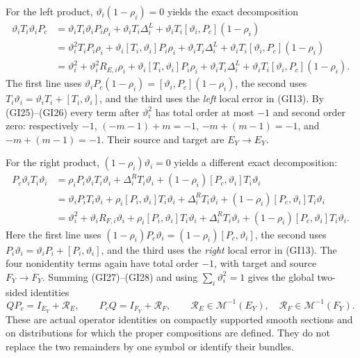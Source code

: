 \documentclass[
  11pt,
]{article}
\begin{document}
For the left product, \(\vartheta_i(1-\rho_i)=0\) yields the exact
decomposition \[
\begin{aligned}
 \vartheta_iT_i\vartheta_iP_c
 &=\vartheta_iT_i\vartheta_iP_i\rho_i
   +\vartheta_iT_i\Delta_i^L
   +\vartheta_iT_i[\vartheta_i,P_c](1-\rho_i)\\
 &=\vartheta_i^2T_iP_i\rho_i
   +\vartheta_i[T_i,\vartheta_i]P_i\rho_i
   +\vartheta_iT_i\Delta_i^L
   +\vartheta_iT_i[\vartheta_i,P_c](1-\rho_i)\\
 &=\vartheta_i^2
   +\vartheta_i^2R_{E,i}\rho_i
   +\vartheta_i[T_i,\vartheta_i]P_i\rho_i
   +\vartheta_iT_i\Delta_i^L
   +\vartheta_iT_i[\vartheta_i,P_c](1-\rho_i).
\end{aligned}
 \tag{GI27}
\] The first line uses
\(\vartheta_iP_c(1-\rho_i)=[\vartheta_i,P_c](1-\rho_i)\), the second
uses \(T_i\vartheta_i=\vartheta_iT_i+[T_i,\vartheta_i]\), and the third
uses the \emph{left} local error in (GI13). By (GI25)--(GI26) every term
after \(\vartheta_i^2\) has total order at most \(-1\) and second order
zero: respectively \(-1\), \((-m-1)+m=-1\), \(-m+(m-1)=-1\), and
\(-m+(m-1)=-1\). Their source and target are \(E_Y\to E_Y\).

For the right product, \((1-\rho_i)\vartheta_i=0\) yields a different
exact decomposition: \[
\begin{aligned}
 P_c\vartheta_iT_i\vartheta_i
 &=\rho_iP_i\vartheta_iT_i\vartheta_i
   +\Delta_i^R T_i\vartheta_i
   +(1-\rho_i)[P_c,\vartheta_i]T_i\vartheta_i\\
 &=\vartheta_iP_iT_i\vartheta_i
   +\rho_i[P_i,\vartheta_i]T_i\vartheta_i
   +\Delta_i^RT_i\vartheta_i
   +(1-\rho_i)[P_c,\vartheta_i]T_i\vartheta_i\\
 &=\vartheta_i^2+\vartheta_iR_{F,i}\vartheta_i
   +\rho_i[P_i,\vartheta_i]T_i\vartheta_i
   +\Delta_i^RT_i\vartheta_i
   +(1-\rho_i)[P_c,\vartheta_i]T_i\vartheta_i.
\end{aligned}
 \tag{GI28}
\] Here the first line uses
\((1-\rho_i)P_c\vartheta_i=(1-\rho_i)[P_c,\vartheta_i]\), the second
uses \(P_i\vartheta_i=\vartheta_iP_i+[P_i,\vartheta_i]\), and the third
uses the \emph{right} local error in (GI13). The four nonidentity terms
again have total order \(-1\), with target and source \(F_Y\to F_Y\).
Summing (GI27)--(GI28) and using \(\sum_i\vartheta_i^2=1\) gives the
global two-sided identities \[
 QP_c=I_{E_Y}+\mathcal R_E,\qquad
 P_cQ=I_{F_Y}+\mathcal R_F,
 \qquad \mathcal R_E\in\mathscr M^{-1}(E_Y),\quad
 \mathcal R_F\in\mathscr M^{-1}(F_Y).
 \tag{GI29}
\] These are actual operator identities on compactly supported smooth
sections and on distributions for which the proper compositions are
defined. They do not replace the two remainders by one symbol or
identify their bundles.
\end{document}
